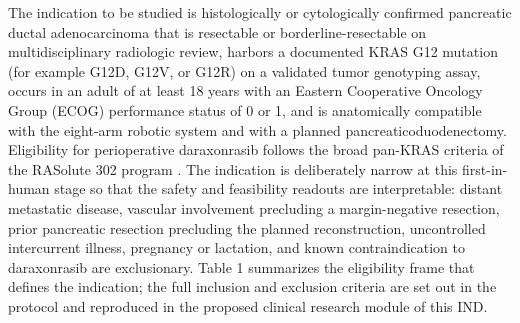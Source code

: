 The indication to be studied is histologically or cytologically confirmed pancreatic
ductal adenocarcinoma that is resectable or borderline-resectable on
multidisciplinary radiologic review, harbors a documented KRAS G12 mutation (for
example G12D, G12V, or G12R) on a validated tumor genotyping assay, occurs in an
adult of at least 18 years with an Eastern Cooperative Oncology Group (ECOG)
performance status of 0 or 1, and is anatomically compatible with the eight-arm
robotic system and with a planned pancreaticoduodenectomy. Eligibility for
perioperative daraxonrasib follows the broad pan-KRAS criteria of the RASolute 302
program \cite{daraxwhipple}. The indication is deliberately narrow at this
first-in-human stage so that the safety and feasibility readouts are interpretable:
distant metastatic disease, vascular involvement precluding a margin-negative
resection, prior pancreatic resection precluding the planned reconstruction,
uncontrolled intercurrent illness, pregnancy or lactation, and known
contraindication to daraxonrasib are exclusionary. Table 1 summarizes the
eligibility frame that defines the indication; the full inclusion and exclusion
criteria are set out in the protocol and reproduced in the proposed clinical
research module of this IND.

